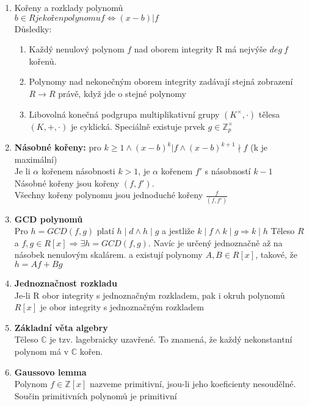 \documentclass[12pt,a4paper]{article}
\begin{document}
\begin{enumerate}
\begin{enumerate}
			\item Kořeny a rozklady polynomů\\
				$b \in R je kořen polynomu f \Leftrightarrow (x-b)|f$\\
				Důsledky:
				\begin{enumerate}
				 	\item Každý nenulový polynom $f$ nad oborem integrity R má nejvýše $deg~f$ kořenů.\\
					\item Polynomy nad nekonečným oborem integrity zadávají stejná zobrazení $R \rightarrow R$ právě, když jde o stejné polynomy
					\item Libovolná konečná podgrupa multiplikativní grupy $(K^{\times},\cdot)$ tělesa $(K,+,\cdot)$ je cyklická. Speciálně existuje prvek $g \in \mathbb{Z}^{\times}_{p}$
				\end{enumerate}
				\item \textbf{Násobné kořeny:} pro $k \geq 1 \land (x-b)^k|f \land (x-b)^{k+1} \nmid f$  (k je maximální)\\
					Je li $\alpha$ kořenem násobnosti $k >1$, je $\alpha$ kořenem $f'$ s násobností $k-1$\\
					Násobné kořeny jsou kořeny $(f,f')$.\\ Všechny kořeny polynomu jsou jednoduché kořeny $\frac{f}{(f,f')}$
				\item \textbf{GCD polynomů}\\
					Pro $h=GCD(f,g)$ platí $h \mid d \land h \mid g$ a jestliže $k \mid f \land k \mid g \Rightarrow k \mid h$
					Těleso $R$ a $f,g \in R[x] \Rightarrow \exists h=GCD(f,g)$. Navíc je určený jednoznačně až na násobek nenulovým skalárem. a existují polynomy $A, B \in R[x]$, takové, že $h=Af+Bg$
				\item \textbf{Jednoznačnost rozkladu}\\
					Je-li R obor integrity s jednoznačným rozkladem, pak i okruh polynomů $R[x]$ je obor integrity s jednoznačným rozkladem
				\item \textbf{Základní věta algebry}\\
					Těleso $\mathbb{C}$ je tzv. lagebraicky uzavřené. To znamená, že každý nekonstantní polynom má v $\mathbb{C}$ kořen.
				\item \textbf{Gaussovo lemma}\\
					Polynom $f \in \mathbb{Z}[x]$ nazveme primitivní, jsou-li jeho koeficienty nesoudělné.\\
					Součin primitivních polynomů je primitivní\\

\end{enumerate}
\end{enumerate}
\end{document}
